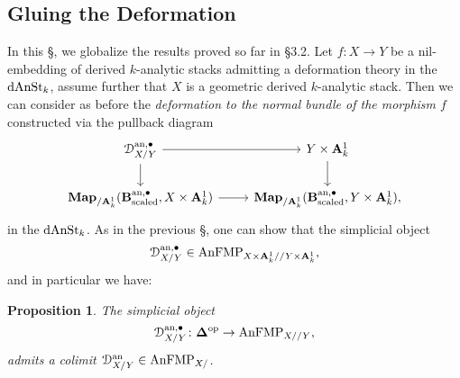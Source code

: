 \documentclass[10pt,a4paper,reqno]{amsart} %
\theoremstyle{plain}
\newtheorem{prop}[thm]{Proposition}
\theoremstyle{definition}
\theoremstyle{remark}
\numberwithin{equation}{section}
\begin{document}
\subsection{Gluing the Deformation} In this \S, we globalize the results proved so far in \S 3.2. Let $f \colon X \to Y$ be a nil-embedding of derived $k$-analytic stacks admitting a deformation theory
in the \infcat $\mathrm{dAnSt}_k$, assume further that $X$ is a geometric derived $k$-analytic stack.
Then we can consider as before the \emph{deformation to the normal bundle of the morphism $f$} constructed via the pullback diagram
    \[
    \begin{tikzcd}
        \cD^{\mathrm{an}, \bullet}_{X/ Y} \ar{r} \ar{d} & Y \times \bA^1_k \ar{d} \\
        \bfMap_{/ \bA^1_k} (\bB^{\mathrm{an}, \bullet}_\mathrm{scaled}, X \times \bA^1_k) \ar{r} & \bfMap_{/ \bA^1_k}(\bB^{\mathrm{an},\bullet}_{\mathrm{scaled}}, Y \times \bA^1_k),
    \end{tikzcd}
    \]
in the \infcat $\mathrm{dAnSt}_k$. As in the previous \S, one can show that the simplicial object 
    \[
        \mathcal D^{\mathrm{an}, \bullet}_{X/ Y} \in \mathrm{AnFMP}_{X \times \mathbf A^1_k/ /Y \times \mathbf A^1_k},  
    \]
and in particular we have:

\begin{prop}
    The simplicial object
        \[
            \mathcal D_{X/ Y}^{\mathrm{an}, \bullet} \colon \bm{\Delta} ^\mathrm{op} \to \mathrm{AnFMP}_{X/ /Y},  
        \]
    admits a colimit $\mathcal D_{X/ Y}^\mathrm{an} \in \mathrm{AnFMP}_{X/ }$.
\end{prop}
\end{document}

